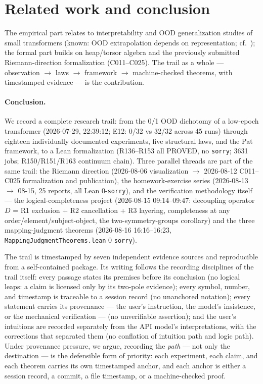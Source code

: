 \documentclass[sigplan,10pt,anonymous,review]{acmart}
\begin{document}
\section{Related work and conclusion}

The empirical part relates to interpretability and OOD generalization studies
of small transformers (known: OOD extrapolation depends on representation;
cf.~\cite{power2022grokking,vaswani2017attention}); the formal part builds on
heap/torsor algebra \cite{bergman2009universal} and the previously submitted
Riemann-direction formalization (C011--C025). The trail as a whole ---
observation $\to$ laws $\to$ framework $\to$ machine-checked theorems, with
timestamped evidence --- is the contribution.

\paragraph{Conclusion.} We record a complete research trail: from the 0/1 OOD
dichotomy of a low-epoch transformer (2026-07-29, 22:39:12; E12: 0/32 vs
32/32 across 45 runs) through eighteen individually documented experiments,
five structural laws, and the Pat framework, to a Lean formalization
(R136--R153 all PROVED, no \texttt{sorry}; 3631 jobs; R150/R151/R163
continuum chain). Three parallel threads are part of the same trail: the
Riemann direction (2026-08-06 visualization $\to$ 2026-08-12 C011--C025
formalization and publication), the homework-exercise series (2026-08-13
$\to$ 08-15, 25 reports, all Lean 0-\texttt{sorry}), and the verification
methodology itself --- the logical-completeness project (2026-08-15
09:14--09:47: decoupling operator $D$ = R1 exclusion + R2 cancellation +
R3 layering, completeness at any order/element/subject-object, the
two-symmetry-groups corollary) and the three mapping-judgment theorems
(2026-08-16 16:16--16:23, \texttt{MappingJudgmentTheorems.lean} 0
\texttt{sorry}).

The trail is timestamped by seven independent evidence sources and
reproducible from a self-contained package. Its writing follows the
recording disciplines of the trail itself: every passage states its
premises before its conclusion (no logical leaps: a claim is licensed only
by its two-pole evidence); every symbol, number, and timestamp is
traceable to a session record (no unanchored notation); every statement
carries its provenance --- the user's instruction, the model's insistence,
or the mechanical verification --- (no unverifiable assertion); and the
user's intuitions are recorded separately from the API model's
interpretations, with the corrections that separated them (no conflation
of intuition path and logic path). Under provenance pressure, we argue,
recording the \emph{path} --- not only the destination --- is the
defensible form of priority: each experiment, each claim, and each theorem
carries its own timestamped anchor, and each anchor is either a session
record, a commit, a file timestamp, or a machine-checked proof.
\end{document}
